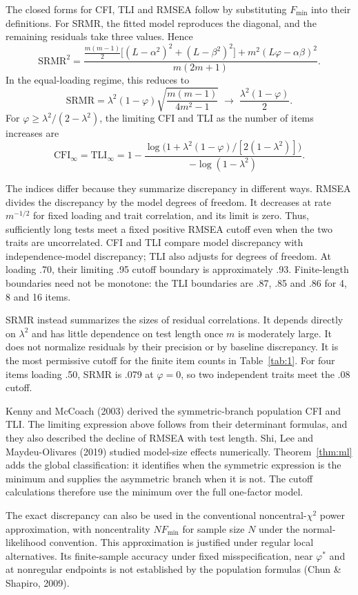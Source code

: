 The closed forms for CFI, TLI and RMSEA follow by substituting $F_{\min}$ into their definitions. For SRMR, the fitted model reproduces the diagonal, and the remaining residuals take three values. Hence
\[
\mathrm{SRMR}^2=
\frac{\tfrac{m(m-1)}{2}\big[(L-\alpha^2)^2+(L-\beta^2)^2\big]+m^2(L\varphi-\alpha\beta)^2}
{m(2m+1)}.
\]
In the equal-loading regime, this reduces to
\[
\mathrm{SRMR}
=\lambda^2(1-\varphi)\sqrt{\frac{m(m-1)}{4m^2-1}}
\;\longrightarrow\;\frac{\lambda^2(1-\varphi)}{2}.
\]
For $\varphi\ge\lambda^2/(2-\lambda^2)$, the limiting CFI and TLI as the number of items increases are
\[
\mathrm{CFI}_{\infty}=\mathrm{TLI}_{\infty}
=1-\frac{\log\big(1+\lambda^2(1-\varphi)/[2(1-\lambda^2)]\big)}
{-\log(1-\lambda^2)}.
\]

The indices differ because they summarize discrepancy in different ways. RMSEA divides the discrepancy by the model degrees of freedom. It decreases at rate $m^{-1/2}$ for fixed loading and trait correlation, and its limit is zero. Thus, sufficiently long tests meet a fixed positive RMSEA cutoff even when the two traits are uncorrelated. CFI and TLI compare model discrepancy with independence-model discrepancy; TLI also adjusts for degrees of freedom. At loading .70, their limiting .95 cutoff boundary is approximately .93. Finite-length boundaries need not be monotone: the TLI boundaries are .87, .85 and .86 for 4, 8 and 16 items.

SRMR instead summarizes the sizes of residual correlations. It depends directly on $\lambda^2$ and has little dependence on test length once $m$ is moderately large. It does not normalize residuals by their precision or by baseline discrepancy. It is the most permissive cutoff for the finite item counts in Table~\ref{tab:1}. For four items loading .50, SRMR is .079 at $\varphi=0$, so two independent traits meet the .08 cutoff.

Kenny and McCoach (2003) derived the symmetric-branch population CFI and TLI. The limiting expression above follows from their determinant formulas, and they also described the decline of RMSEA with test length. Shi, Lee and Maydeu-Olivares (2019) studied model-size effects numerically. Theorem~\ref{thm:ml} adds the global classification: it identifies when the symmetric expression is the minimum and supplies the asymmetric branch when it is not. The cutoff calculations therefore use the minimum over the full one-factor model.

The exact discrepancy can also be used in the conventional noncentral-$\chi^2$ power approximation, with noncentrality $NF_{\min}$ for sample size $N$ under the normal-likelihood convention. This approximation is justified under regular local alternatives. Its finite-sample accuracy under fixed misspecification, near $\varphi^*$ and at nonregular endpoints is not established by the population formulas (Chun \& Shapiro, 2009).

